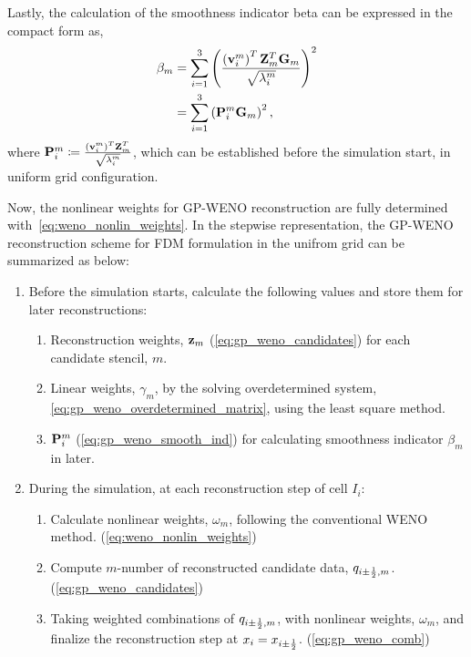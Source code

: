 Lastly, the calculation of the smoothness indicator beta can be expressed in the compact form as,
\begin{equation}\label{eq:gp_weno_smooth_ind}
    \begin{split}
        \beta_{m} &= \sum_{i=1}^{3} \left( \frac{ \left( \mathbf{v}_{i}^{m} \right)^{T} \mathbf{Z}_{m}^{T} \mathbf{G}_{m} }{\sqrt{\lambda_{i}^{m}}} \right)^{2} \\
                  &= \sum_{i=1}^{3} \left( \mathbf{P}_{i}^{m} \mathbf{G}_{m} \right)^{2},
    \end{split}
\end{equation}
where \( \mathbf{P}_{i}^{m} \coloneqq \frac{ \left(\mathbf{v}_{i}^{m}\right)^{T} \mathbf{Z}_{m}^{T}}{\sqrt{\lambda_{i}^{m}}} \),
which can be established before the simulation start, in uniform grid configuration.

Now, the nonlinear weights for GP-WENO reconstruction are fully determined
with~\cref{eq:weno_nonlin_weights}.
In the stepwise representation, the GP-WENO reconstruction scheme for FDM formulation
in the unifrom grid can be summarized as below:
\begin{enumerate}
    \item Before the simulation starts, calculate the following values and store them for later reconstructions:
        \begin{enumerate}
            \item Reconstruction weights, \( \mathbf{z}_{m} \) (\cref{eq:gp_weno_candidates}) for each candidate stencil, \( m \).
            \item Linear weights, \( \gamma_{m} \), by the solving overdetermined system, \cref{eq:gp_weno_overdetermined_matrix},
                using the least square method.
            \item \( \mathbf{P}_{i}^{m} \) (\cref{eq:gp_weno_smooth_ind}) for calculating smoothness indicator \( \beta_{m} \) in later.
        \end{enumerate}
    \item During the simulation, at each reconstruction step of cell \( I_{i} \):
        \begin{enumerate}
            \item Calculate nonlinear weights, \( \omega_{m} \), following the conventional WENO method. (\cref{eq:weno_nonlin_weights})
            \item Compute \( m \)-number of reconstructed candidate data, \( q_{i \pm \frac{1}{2}, m} \). (\cref{eq:gp_weno_candidates})
            \item Taking weighted combinations of \( q_{i \pm \frac{1}{2}, m} \), with nonlinear weights, \( \omega_{m} \),
                and finalize the reconstruction step at \( x_{i} = x_{i \pm \frac{1}{2}} \). (\cref{eq:gp_weno_comb})
        \end{enumerate}
\end{enumerate}

